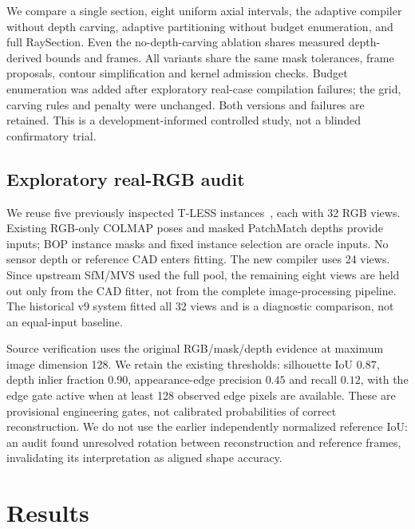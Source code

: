 \documentclass[10pt]{article}
\newcommand{\method}{RaySection}
\begin{document}
We compare a single section, eight uniform axial intervals, the adaptive
compiler without depth carving, adaptive partitioning without budget enumeration,
and full \method. Even the no-depth-carving ablation shares measured
depth-derived bounds and frames. All variants share the same mask tolerances,
frame proposals, contour simplification and kernel admission checks.
Budget enumeration was added after exploratory real-case compilation failures;
the grid, carving rules and penalty were unchanged. Both versions and failures
are retained. This is a development-informed controlled study, not a blinded
confirmatory trial.

\subsection{Exploratory real-RGB audit}
We reuse five previously inspected T-LESS instances~\cite{tless2017}, each with
32 RGB views. Existing RGB-only COLMAP poses and masked PatchMatch depths provide
inputs; BOP instance masks and fixed instance selection are oracle inputs.
No sensor depth or reference CAD enters fitting. The new compiler uses 24 views.
Since upstream SfM/MVS used the full pool, the remaining eight views are held
out only from the CAD fitter, not from the complete image-processing pipeline.
The historical v9 system fitted all 32 views and is a diagnostic comparison,
not an equal-input baseline.

Source verification uses the original RGB/mask/depth evidence at maximum image
dimension 128. We retain the existing thresholds: silhouette IoU $0.87$, depth
inlier fraction $0.90$, appearance-edge precision $0.45$ and recall $0.12$, with
the edge gate active when at least 128 observed edge pixels are available.
These are provisional engineering gates, not calibrated probabilities of
correct reconstruction. We do not use the earlier independently normalized
reference IoU: an audit found unresolved rotation between reconstruction and
reference frames, invalidating its interpretation as aligned shape accuracy.

\section{Results}
\begin{table}[t]
\centering\small
\caption{Controlled simulated-depth study, 30 instances. CD$^2$ is symmetric
squared Chamfer times 1000; view IoU uses fitting-excluded masks. IoU includes
invalid outputs as zero. Remaining means and median fit time condition on valid
outputs. Extr. counts emitted extrusion solids, not section intervals.}
\label{tab:controlled}
\end{table}
\end{document}
